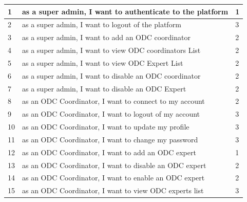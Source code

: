 \begin{longtable}{|l|p{10cm}|l|}
      1                                         & as a super admin, I want to authenticate to the platform & 1                 \\ \hline
      2                                         & as a super admin, I want to logout of the platform       & 3                 \\ \hline
      3                                         & as a super admin, I want to add an ODC coordinator       & 2                 \\ \hline
      4                                         & as a super admin, I want to view ODC coordinators List   & 2                 \\ \hline
      5                                         & as a super admin, I want to view ODC Expert List         & 2                 \\ \hline
      6                                         & as a super admin, I want to disable an ODC coordinator   & 2                 \\ \hline
      7                                         & as a super admin, I want to disable an ODC Expert        & 2                 \\ \hline
      8                                         & as an ODC Coordinator, I want to connect to my account   & 2                 \\ \hline
      9                                         & as an ODC Coordinator, I want to logout of my account    & 3                 \\ \hline
      10                                        & as an ODC Coordinator, I want to update my profile       & 3                 \\ \hline
      11                                        & as an ODC Coordinator, I want to change my password      & 3                 \\ \hline
      12                                        & as an ODC Coordinator, I want to add an ODC expert       & 1                 \\ \hline
      13                                        & as an ODC Coordinator, I want to disable an ODC expert   & 2                 \\ \hline
      14                                        & as an ODC Coordinator, I want to enable an ODC expert    & 2                 \\ \hline
      15                                        & as an ODC Coordinator, I want to view ODC experts list   & 3                 \\ \hline

\end{longtable}
